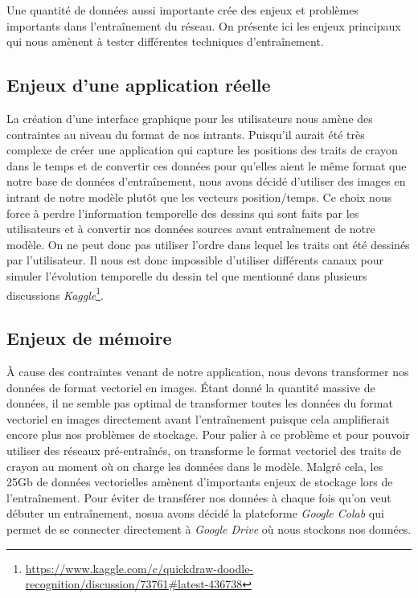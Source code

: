 Une quantité de données aussi importante crée des enjeux et problèmes importants dans l'entraînement du réseau. On présente ici les enjeux principaux qui nous amènent à tester différentes techniques d'entraînement.

\subsection{Enjeux d'une application réelle}

La création d'une interface graphique pour les utilisateurs nous amène des contraintes au niveau du format de nos intrants.
Puisqu'il aurait été très complexe de créer une application qui capture les positions des traits de crayon dans le temps et de convertir ces données pour qu'elles aient le même format que notre base de données d'entraînement, nous avons décidé d'utiliser des images en intrant de notre modèle plutôt que les vecteurs position/temps.
Ce choix nous force à perdre l'information temporelle des dessins qui sont faits par les utilisateurs et à convertir nos données sources avant entraînement de notre modèle.
On ne peut donc pas utiliser l'ordre dans lequel les traits ont été dessinés par l'utilisateur. 
Il nous est donc impossible d'utiliser différents canaux pour simuler l'évolution temporelle du dessin tel que mentionné dans plusieurs discussions \emph{Kaggle}\footnote{\url{https://www.kaggle.com/c/quickdraw-doodle-recognition/discussion/73761#latest-436738}}.

\subsection{Enjeux de mémoire}

À cause des contraintes venant de notre application, nous devons transformer nos données de format vectoriel en images. 
Étant donné la quantité massive de données, il ne semble pas optimal de transformer toutes les données du format vectoriel en images directement avant l'entraînement puisque cela amplifierait encore plus nos problèmes de stockage.
Pour palier à ce problème et pour pouvoir utiliser des réseaux pré-entraînés, on transforme le format vectoriel des traits de crayon au moment où on charge les données dans le modèle.
Malgré cela, les 25Gb de données vectorielles amènent d'importants enjeux de stockage lors de l'entraînement.
Pour éviter de transférer nos données à chaque fois qu'on veut débuter un entraînement, nosua avons décidé la plateforme \emph{Google Colab} qui permet de se connecter directement à \emph{Google Drive} où nous stockons nos données.

